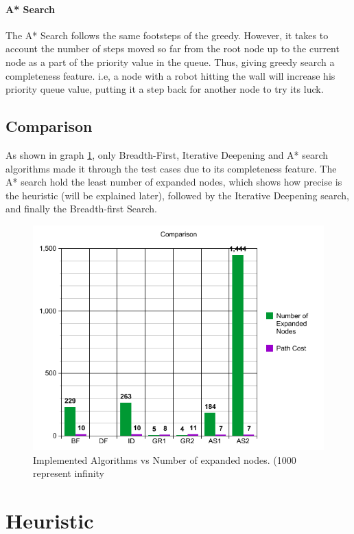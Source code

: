 \subsubsection{A* Search}
The A* Search follows the same footsteps of the greedy. However, it takes to account the number of steps moved so far from the root node up to the current node as a part of the priority value in the queue. Thus, giving greedy search a completeness feature. i.e, a node with a robot hitting the wall will increase his priority queue value, putting it a step back for another node to try its luck.

\section{Comparison}

As shown in graph \ref{fig:graph}, only Breadth-First, Iterative Deepening and A* search algorithms made it through the test cases due to its completeness feature.  The A* search hold the least number of expanded nodes, which shows how precise is the heuristic (will be explained later), followed by the Iterative Deepening search, and finally the Breadth-first Search.

\begin{figure}[H] 
   	\centering
	\includegraphics[scale=0.6]{images/Graph} 
    \caption{Implemented Algorithms vs Number of expanded nodes. (1000 represent infinity}
    \label{fig:graph} 
\end{figure}




\chapter{Heuristic}
